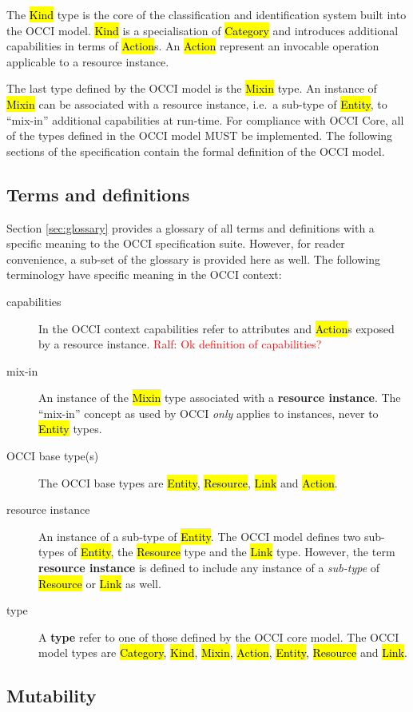 \documentclass[10pt,a4paper]{article}
\newcommand{\ralf}[1]{\textcolor{red}{Ralf: #1}}
\begin{document}
The \hl{Kind} type is the core of the classification and identification
system built into the OCCI model. \hl{Kind} is a specialisation of
\hl{Category} and introduces additional capabilities in terms of \hl{Action}s.
An \hl{Action} represent an invocable operation applicable to a resource
instance.

The last type defined by the OCCI model is the \hl{Mixin} type. An instance of
\hl{Mixin} can be associated with a resource instance, i.e.~a sub-type of
\hl{Entity}, to ``mix-in'' additional capabilities at run-time.
%
For compliance with OCCI Core, all of the types defined in the OCCI model MUST
be implemented.  The following sections of the specification contain the formal
definition of the OCCI model.

\subsection{Terms and definitions}
Section \ref{sec:glossary} provides a glossary of all terms and definitions with
a specific meaning to the OCCI specification suite. However, for reader
convenience, a sub-set of the glossary is provided here as well. The following
terminology have specific meaning in the OCCI context:
\begin{description}
\item[capabilities] In the OCCI context capabilities refer to attributes and
 \hl{Action}s exposed by a resource instance.
\ralf{Ok definition of capabilities?}
\item[mix-in] An instance of the \hl{Mixin} type associated with a {\bf resource
 instance}. The ``mix-in'' concept as used by OCCI {\em only} applies to
 instances, never to \hl{Entity} types.
\item[OCCI base type(s)] The OCCI base types are \hl{Entity}, \hl{Resource},
 \hl{Link} and \hl{Action}.
\item[resource instance] An instance of a sub-type of \hl{Entity}. The OCCI
 model defines two sub-types of \hl{Entity}, the \hl{Resource} type and the
 \hl{Link} type.  However, the term {\bf resource instance} is defined to
 include any instance of a {\em sub-type} of \hl{Resource} or \hl{Link} as
 well.
\item[type] A {\bf type} refer to one of those defined by the OCCI core model.
The OCCI model types are \hl{Category}, \hl{Kind}, \hl{Mixin}, \hl{Action},
\hl{Entity}, \hl{Resource} and \hl{Link}.
\end{description}

\subsection{Mutability}
\end{document}
